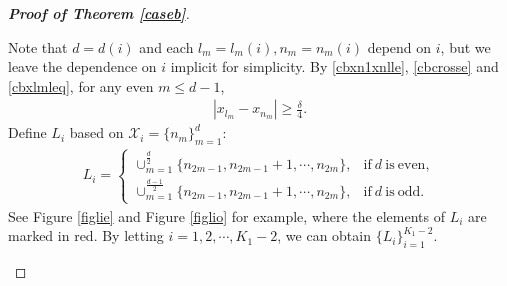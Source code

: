 \documentclass[12pt]{amsart}
\newcommand{\abs}[1]{\left\lvert #1 \right\rvert}
\theoremstyle{plain}
\theoremstyle{definition}
\begin{document}
\begin{proof}[\textbf{Proof of Theorem \ref{caseb}}]
\begin{figure}[H]
\begin{tikzpicture}[x=0.75pt,y=0.75pt,yscale=-1,xscale=1]
		
	\end{tikzpicture}
	\caption{}
	\label{cbfigadele}
\end{figure}


 Note that $d=d(i)$ and each $l_m=l_m(i),n_m=n_m(i)$ depend on $i$, but we leave the dependence on $i$ implicit for simplicity. 
By \eqref{cbxn1xnlle}, \eqref{cbcrosse} and \eqref{cbxlmleq}, for any even $m\leq d-1$,
 \begin{align}
 	\label{cbnmlm}\abs{x_{l_m}-x_{n_m}}\geq \frac{\delta}{4}.
 \end{align}
 Define $L_i$ based on $\mathcal{X}_i=\{n_m\}^d_{m=1}$:
	\begin{align}
		L_i=\begin{cases}
			\cup_{m=1}^{\frac{d}{2}}\{n_{2m-1},n_{2m-1}+1,\cdots,n_{2m}\}, &\mathrm{if}\ d\ \mathrm{is\ even},\\
			\cup_{m=1}^{\frac{d-1}{2}}\{n_{2m-1},n_{2m-1}+1,\cdots,n_{2m}\}, &\mathrm{if}\ d\ \mathrm{is\ odd}.\nonumber
		\end{cases}
	\end{align}
	See Figure \ref{figlie} and Figure \ref{figlio} for example, where the elements of $L_i$ are marked in red.
	By letting $i=1,2,\cdots,K_1-2$, we can obtain $\{L_i\}_{i=1}^{K_1-2}$.
\begin{figure}[H]
	\centering
	
	
	
	
	\begin{tikzpicture}[x=0.75pt,y=0.75pt,yscale=-1,xscale=1]
		

\end{tikzpicture}
\end{figure}
\end{proof}
\end{document}
